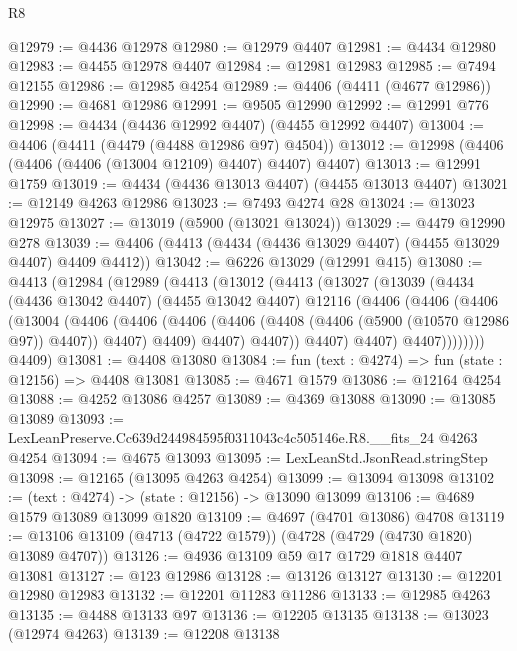\begin{lexlean}{R8}
\begin{coremodule}
@12979 := @4436 @12978
@12980 := @12979 @4407
@12981 := @4434 @12980
@12983 := @4455 @12978 @4407
@12984 := @12981 @12983
@12985 := @7494 @12155
@12986 := @12985 @4254
@12989 := @4406 (@4411 (@4677 @12986))
@12990 := @4681 @12986
@12991 := @9505 @12990
@12992 := @12991 @776
@12998 := @4434 (@4436 @12992 @4407) (@4455 @12992 @4407)
@13004 := @4406 (@4411 (@4479 (@4488 @12986 @97) @4504))
@13012 := @12998 (@4406 (@4406 (@4406 (@13004 @12109) @4407) @4407) @4407)
@13013 := @12991 @1759
@13019 := @4434 (@4436 @13013 @4407) (@4455 @13013 @4407)
@13021 := @12149 @4263 @12986
@13023 := @7493 @4274 @28
@13024 := @13023 @12975
@13027 := @13019 (@5900 (@13021 @13024))
@13029 := @4479 @12990 @278
@13039 := @4406 (@4413 (@4434 (@4436 @13029 @4407) (@4455 @13029 @4407) @4409 @4412))
@13042 := @6226 @13029 (@12991 @415)
@13080 := @4413
    (@12984
      (@12989
        (@4413
          (@13012
            (@4413
              (@13027
                (@13039
                  (@4434
                    (@4436 @13042 @4407)
                    (@4455 @13042 @4407)
                    @12116
                    (@4406
                      (@4406
                        (@4406
                          (@13004
                            (@4406
                              (@4406
                                (@4406
                                  (@4406 (@4408 (@4406 (@5900 (@10570 @12986 @97)) @4407)) @4407)
                                  @4409)
                                @4407)
                              @4407))
                          @4407)
                        @4407)
                      @4407))))))))
      @4409)
@13081 := @4408 @13080
@13084 := fun (text : @4274) => fun (state : @12156) => @4408 @13081
@13085 := @4671 @1579
@13086 := @12164 @4254
@13088 := @4252 @13086 @4257
@13089 := @4369 @13088
@13090 := @13085 @13089
@13093 := LexLeanPreserve.Cc639d244984595f0311043c4c505146e.R8.__fits_24 @4263 @4254
@13094 := @4675 @13093
@13095 := LexLeanStd.JsonRead.stringStep
@13098 := @12165 (@13095 @4263 @4254)
@13099 := @13094 @13098
@13102 := (text : @4274) -> (state : @12156) -> @13090 @13099
@13106 := @4689 @1579 @13089 @13099 @1820
@13109 := @4697 (@4701 @13086) @4708
@13119 := @13106 @13109 (@4713 (@4722 @1579)) (@4728 (@4729 (@4730 @1820) @13089 @4707))
@13126 := @4936 @13109 @59 @17 @1729 @1818 @4407 @13081
@13127 := @123 @12986
@13128 := @13126 @13127
@13130 := @12201 @12980 @12983
@13132 := @12201 @11283 @11286
@13133 := @12985 @4263
@13135 := @4488 @13133 @97
@13136 := @12205 @13135
@13138 := @13023 (@12974 @4263)
@13139 := @12208 @13138

\end{coremodule}
\end{lexlean}
